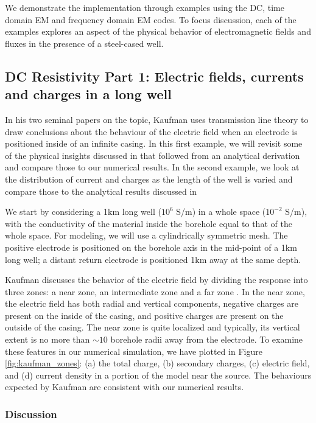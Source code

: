 \documentclass[preprint,review,3p,times,onecolumn,authoryear]{elsarticle}
\begin{document}
We demonstrate the implementation through examples using the DC, time domain EM and frequency domain EM codes. To focus discussion, each of the examples explores an aspect of the physical behavior of electromagnetic fields and fluxes in the presence of a steel-cased well.
\subsection{DC Resistivity Part 1: Electric fields, currents and charges in a long well}
\label{sec:dc_resistivity_part1}

In his two seminal papers on the topic, Kaufman uses transmission line theory to draw conclusions about the behaviour of the electric field when an electrode is positioned inside of an infinite casing. In this first example, we will revisit some of the physical insights discussed in \citep{Kaufman1990, Kaufman1993} that followed from an analytical derivation and compare those to our numerical results. In the second example, we look at the distribution of current and charges as the length of the well is varied and compare those to the analytical results discussed in \citep{Kaufman1993}

We start by considering a 1km long well ($10^6$ S/m) in a whole space ($10^{-2}$ S/m), with the conductivity of the material inside the borehole equal to that of the whole space.  For modeling, we will use a cylindrically symmetric mesh. The positive electrode is positioned on the borehole axis in the mid-point of a 1km long well;  a distant return electrode is positioned 1km away at the same depth.

Kaufman discusses the behavior of the electric field by dividing the response into three zones: a near zone, an intermediate zone and a far zone \citep{Kaufman1990, Kaufman1993}. In the near zone, the electric field has both radial and vertical components, negative charges are present on the inside of the casing, and positive charges are present on the outside of the casing. The near zone is quite localized and typically, its vertical extent is no more than $\sim 10$ borehole radii away from the electrode. To examine these features in our numerical simulation, we have plotted in Figure \ref{fig:kaufman_zones}: (a)  the total charge, (b) secondary charges, (c) electric field, and (d) current density in a portion of the model near the source. The behaviours expected by Kaufman are consistent with our numerical results.

\subsubsection{Discussion}
\end{document}
